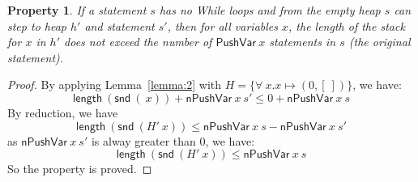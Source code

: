 \documentclass[letter, notitlepage]{article}
\newtheorem{property}{Property}
\begin{document}
\begin{property}
If a statement $s$ has no While loops and from the empty heap $s$ can step to heap $h'$ and statement $s'$, then for all variables $x$, the length of the stack for $x$ in $h'$ does not exceed the number of $\mathsf{PushVar}~x$ statements in $s$ (the original statement).
\end{property}
\begin{proof}
 By applying Lemma~\ref{lemma:2} with $H=\{\forall~x.x\mapsto (0,[~])\}$, we have:
 	$$\mathsf{length}~(\mathsf{snd}~(~x)) + \mathsf{nPushVar}~x~s' \leq 0 + \mathsf{nPushVar}~x~s$$
 By reduction, we have 
 	$$\mathsf{length}~(\mathsf{snd}~(H'~x)) \leq \mathsf{nPushVar}~x~s - \mathsf{nPushVar}~x~s'$$
 as $\mathsf{nPushVar}~x~s'$ is alway greater than 0, we have:
 	$$\mathsf{length}~(\mathsf{snd}~(H'~x)) \leq \mathsf{nPushVar}~x~s$$
 So the property is proved.
\end{proof}
\end{document}

